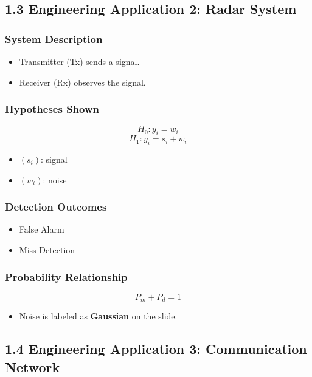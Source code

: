 \documentclass[12pt]{article}
\begin{document}
\subsection*{1.3 Engineering Application 2: Radar System}

\subsubsection*{System Description}

\begin{itemize}
  \item Transmitter (Tx) sends a signal.
  \item Receiver (Rx) observes the signal.
\end{itemize}

\subsubsection*{Hypotheses Shown}

\[
H_0: y_i = w_i
\]
\[
H_1: y_i = s_i + w_i
\]

\begin{itemize}
  \item $( s_i )$: signal
  \item $( w_i )$: noise
\end{itemize}

\subsubsection*{Detection Outcomes}

\begin{itemize}
  \item False Alarm
  \item Miss Detection
\end{itemize}

\subsubsection*{Probability Relationship}

\[
P_m + P_d = 1
\]

\begin{itemize}
  \item Noise is labeled as \textbf{Gaussian} on the slide.
\end{itemize}

\subsection*{1.4 Engineering Application 3: Communication Network}
\end{document}
